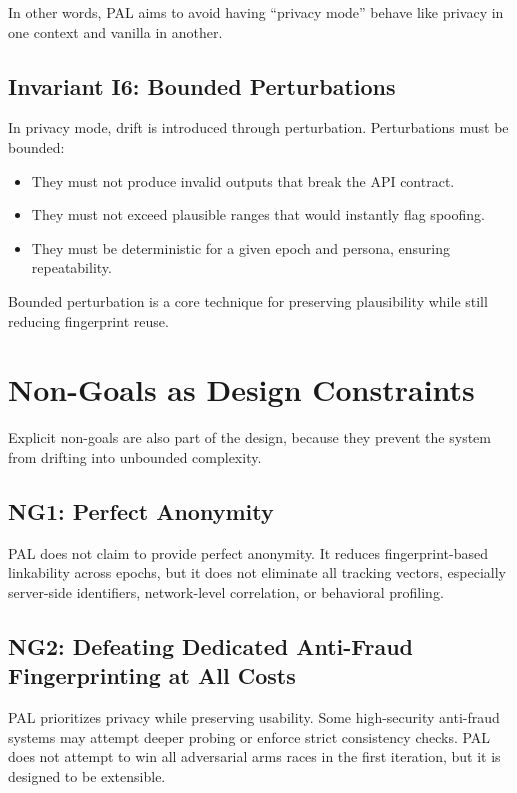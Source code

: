\documentclass[11pt]{report}
\begin{document}
In other words, PAL aims to avoid having ``privacy mode'' behave like privacy in one context and vanilla in another.

\subsection{Invariant I6: Bounded Perturbations}

In privacy mode, drift is introduced through perturbation. Perturbations must be bounded:

\begin{itemize}
    \item They must not produce invalid outputs that break the API contract.
    \item They must not exceed plausible ranges that would instantly flag spoofing.
    \item They must be deterministic for a given epoch and persona, ensuring repeatability.
\end{itemize}

Bounded perturbation is a core technique for preserving plausibility while still reducing fingerprint reuse.

\section{Non-Goals as Design Constraints}

Explicit non-goals are also part of the design, because they prevent the system from drifting into unbounded complexity.

\subsection{NG1: Perfect Anonymity}

PAL does not claim to provide perfect anonymity. It reduces fingerprint-based linkability across epochs, but it does not eliminate all tracking vectors, especially server-side identifiers, network-level correlation, or behavioral profiling.

\subsection{NG2: Defeating Dedicated Anti-Fraud Fingerprinting at All Costs}

PAL prioritizes privacy while preserving usability. Some high-security anti-fraud systems may attempt deeper probing or enforce strict consistency checks. PAL does not attempt to win all adversarial arms races in the first iteration, but it is designed to be extensible.
\end{document}

